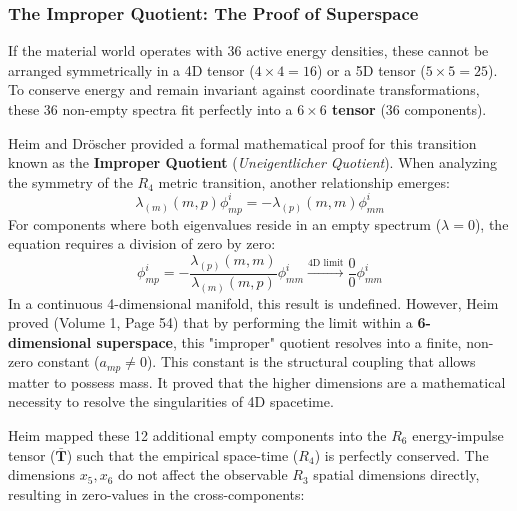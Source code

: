 \documentclass[11pt,a4paper,oneside]{article}
\begin{document}
\subsubsection{The Improper Quotient: The Proof of Superspace}
If the material world operates with 36 active energy densities, these cannot be arranged symmetrically in a 4D tensor ($4 \times 4 = 16$) or a 5D tensor ($5 \times 5 = 25$). To conserve energy and remain invariant against coordinate transformations, these 36 non-empty spectra fit perfectly into a \textbf{$6 \times 6$ tensor} (36 components). 

Heim and Dröscher provided a formal mathematical proof for this transition known as the \textbf{Improper Quotient} (\textit{Uneigentlicher Quotient}). When analyzing the symmetry of the $R_4$ metric transition, another relationship emerges:
\begin{equation}
    \lambda_{(m)}(m, p)\phi_{mp}^i = -\lambda_{(p)}(m, m)\phi_{mm}^i
\end{equation}
For components where both eigenvalues reside in an empty spectrum ($\lambda = 0$), the equation requires a division of zero by zero:
\begin{equation}
    \phi_{mp}^i = -\frac{\lambda_{(p)}(m, m)}{\lambda_{(m)}(m, p)} \phi_{mm}^i \xrightarrow{\text{4D limit}} \frac{0}{0} \phi_{mm}^i
\end{equation}
In a continuous 4-dimensional manifold, this result is undefined. However, Heim proved (Volume 1, Page 54) that by performing the limit within a \textbf{6-dimensional superspace}, this "improper" quotient resolves into a finite, non-zero constant ($a_{mp} \neq 0$). This constant is the structural coupling that allows matter to possess mass. It proved that the higher dimensions are a mathematical necessity to resolve the singularities of 4D spacetime.

Heim mapped these 12 additional empty components into the $R_6$ energy-impulse tensor ($\mathbf{\bar{T}}$) such that the empirical space-time ($R_4$) is perfectly conserved. The dimensions $x_5, x_6$ do not affect the observable $R_3$ spatial dimensions directly, resulting in zero-values in the cross-components:
\end{document}
